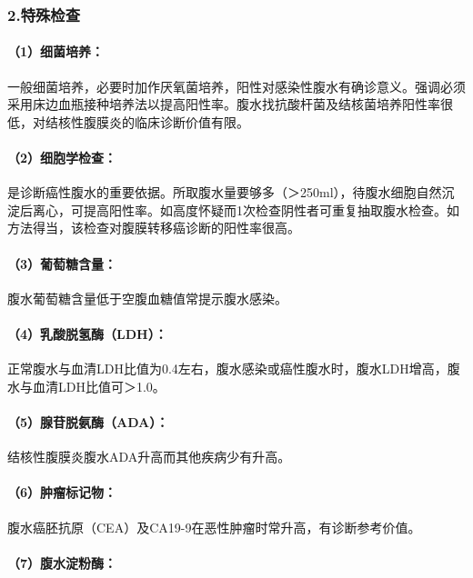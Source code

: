 \subsubsection{2.特殊检查}

\paragraph{（1）细菌培养：}

一般细菌培养，必要时加作厌氧菌培养，阳性对感染性腹水有确诊意义。强调必须采用床边血瓶接种培养法以提高阳性率。腹水找抗酸杆菌及结核菌培养阳性率很低，对结核性腹膜炎的临床诊断价值有限。

\paragraph{（2）细胞学检查：}

是诊断癌性腹水的重要依据。所取腹水量要够多（＞250ml），待腹水细胞自然沉淀后离心，可提高阳性率。如高度怀疑而1次检查阴性者可重复抽取腹水检查。如方法得当，该检查对腹膜转移癌诊断的阳性率很高。

\paragraph{（3）葡萄糖含量：}

腹水葡萄糖含量低于空腹血糖值常提示腹水感染。

\paragraph{（4）乳酸脱氢酶（LDH）：}

正常腹水与血清LDH比值为0.4左右，腹水感染或癌性腹水时，腹水LDH增高，腹水与血清LDH比值可＞1.0。

\paragraph{（5）腺苷脱氨酶（ADA）：}

结核性腹膜炎腹水ADA升高而其他疾病少有升高。

\paragraph{（6）肿瘤标记物：}

腹水癌胚抗原（CEA）及CA19-9在恶性肿瘤时常升高，有诊断参考价值。

\paragraph{（7）腹水淀粉酶：}

